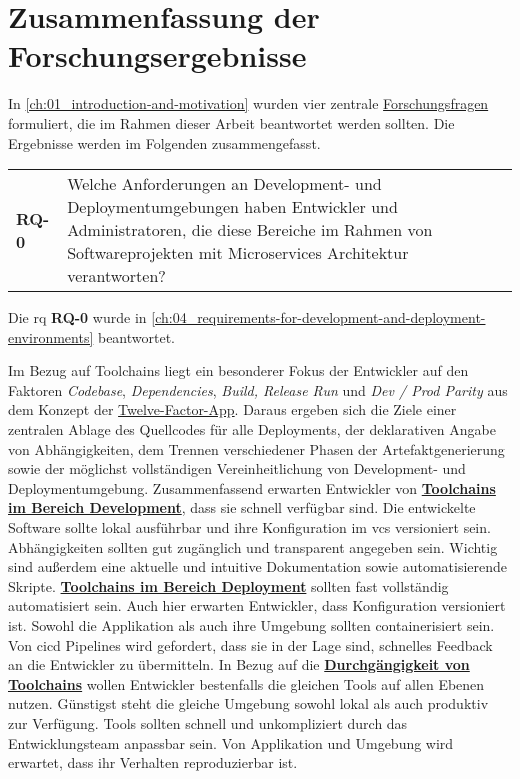 \section{Zusammenfassung der Forschungsergebnisse}
\label{sec:07-01_summary-of-research-results}

In \autoref{ch:01_introduction-and-motivation} wurden vier zentrale \hyperref[sec:01-03_objectives-and-research-questions]{Forschungsfragen} formuliert, die im Rahmen dieser Arbeit beantwortet werden sollten. Die Ergebnisse werden im Folgenden zusammengefasst.

\vspace{1em}
\begin{table}[H]
    \centering
    \begin{tabular}{p{} p{}}
        \textbf{RQ-0} & Welche Anforderungen an Development- und Deploymentumgebungen haben Entwickler und Administratoren, die diese Bereiche im Rahmen von Softwareprojekten mit Microservices Architektur verantworten? \\
    \end{tabular}
\end{table}

Die \acrlong{rq} \textbf{RQ-0} wurde in \autoref{ch:04_requirements-for-development-and-deployment-environments} beantwortet.

Im Bezug auf Toolchains liegt ein besonderer Fokus der Entwickler auf den Faktoren \textit{Codebase}, \textit{Dependencies}, \textit{Build, Release Run} und \textit{Dev / Prod Parity} aus dem Konzept der \hyperref[sec:03-05_concept-of-twelve-factor-app]{Twelve-Factor-App}. Daraus ergeben sich die Ziele einer zentralen Ablage des Quellcodes für alle Deployments, der deklarativen Angabe von Abhängigkeiten, dem Trennen verschiedener Phasen der Artefaktgenerierung sowie der möglichst vollständigen Vereinheitlichung von Development- und Deploymentumgebung. Zusammenfassend erwarten Entwickler von \textbf{\hyperref[subsec:04-02-02_toolchains-in-development]{Toolchains im Bereich Development}}, dass sie schnell verfügbar sind. Die entwickelte Software sollte lokal ausführbar und ihre Konfiguration im \Gls{vcs} versioniert sein. Abhängigkeiten sollten gut zugänglich und transparent angegeben sein. Wichtig sind außerdem eine aktuelle und intuitive Dokumentation sowie automatisierende Skripte. \textbf{\hyperref[subsec:04-02-03_toolchains-in-deployment]{Toolchains im Bereich Deployment}} sollten fast vollständig automatisiert sein. Auch hier erwarten Entwickler, dass Konfiguration versioniert ist. Sowohl die Applikation als auch ihre Umgebung sollten containerisiert sein. Von \Gls{cicd} Pipelines wird gefordert, dass sie in der Lage sind, schnelles Feedback an die Entwickler zu übermitteln. In Bezug auf die \textbf{\hyperref[subsec:04-02-04_consistency-of-toolchains]{Durchgängigkeit von Toolchains}} wollen Entwickler bestenfalls die gleichen Tools auf allen Ebenen nutzen. Günstigst steht die gleiche Umgebung sowohl lokal als auch produktiv zur Verfügung. Tools sollten schnell und unkompliziert durch das Entwicklungsteam anpassbar sein. Von Applikation und Umgebung wird erwartet, dass ihr Verhalten reproduzierbar ist.


